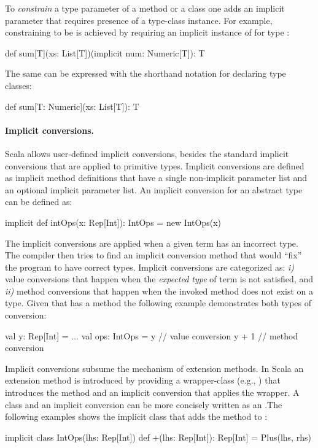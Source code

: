  To \emph{constrain} a type parameter of a method or a class one adds an implicit parameter
  that requires presence of a type-class instance. For example, constraining  to be  is achieved by
  requiring an implicit instance of  for type :\begin{lstparagraph}
def sum[T](xs: List[T])(implicit num: Numeric[T]): T
\end{lstparagraph}
The same can be expressed with the shorthand notation for declaring type classes:\begin{lstparagraph}
def sum[T: Numeric](xs: List[T]): T
\end{lstparagraph}

\paragraph{Implicit conversions.} Scala allows user-defined implicit conversions, besides the standard implicit conversions
 that are applied to primitive types. Implicit conversions are defined as implicit method definitions
 that have a single non-implicit parameter list and an optional implicit parameter list.
  An implicit conversion for an abstract type  can be defined as:\begin{lstparagraph}
implicit def intOps(x: Rep[Int]): IntOps = new IntOps(x)
\end{lstparagraph}

The implicit conversions are applied when a given term has an incorrect type. The compiler then
tries to find an implicit conversion method that would ``fix'' the program to have correct types. Implicit
 conversions are categorized as: \emph{i)} value conversions that happen when the \emph{expected type} of term
is not satisfied, and \emph{ii)} method conversions that happen when the invoked method does not exist
on a type. Given that  has a method \code{+} the following example demonstrates both types
of conversion:\begin{lstparagraph}
val y: Rep[Int] = ...
val ops: IntOps = y // value conversion
y + 1               // method conversion
\end{lstparagraph}


 Implicit conversions subsume the mechanism of extension methods. In Scala an
 extension method is introduced by providing a wrapper-class (e.g., ) that introduces the method and an implicit conversion that applies the wrapper. A class and an implicit conversion can be more concisely written as an .The following examples shows the implicit class that adds the \code{+} method to :\begin{lstparagraph}
 implicit class IntOps(lhs: Rep[Int]) {
   def +(lhs: Rep[Int]): Rep[Int] = Plus(lhs, rhs)
 }
 \end{lstparagraph}




